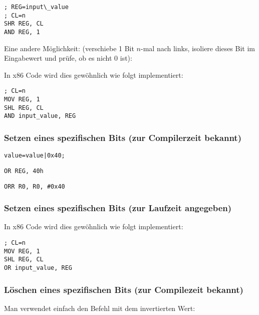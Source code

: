 \begin{lstlisting}[caption=x86,style=customasmx86]
; REG=input\_value
; CL=n
SHR REG, CL
AND REG, 1
\end{lstlisting}
Eine andere Möglichkeit: (verschiebe 1 Bit $n$-mal nach links, isoliere dieses
Bit im Eingabewert und prüfe, ob es nicht 0 ist):



In x86 Code wird dies gewöhnlich wie folgt implementiert:

\begin{lstlisting}[caption=x86,style=customasmx86]
; CL=n
MOV REG, 1
SHL REG, CL
AND input_value, REG
\end{lstlisting}

\subsubsection{Setzen eines spezifischen Bits (zur Compilerzeit bekannt)}

\begin{lstlisting}[caption=\CCpp]
value=value|0x40;
\end{lstlisting}

\begin{lstlisting}[caption=x86,style=customasmx86]
OR REG, 40h
\end{lstlisting}

\begin{lstlisting}[caption=ARM (\ARMMode) and ARM64,style=customasmARM]
ORR R0, R0, #0x40
\end{lstlisting}

\subsubsection{Setzen eines spezifischen Bits (zur Laufzeit angegeben)}



In x86 Code wird dies gewöhnlich wie folgt implementiert:

\begin{lstlisting}[caption=x86,style=customasmx86]
; CL=n
MOV REG, 1
SHL REG, CL
OR input_value, REG
\end{lstlisting}

\subsubsection{Löschen eines spezifischen Bits (zur Compilezeit bekannt)}
Man verwendet einfach den \AND Befehl mit dem invertierten Wert:

